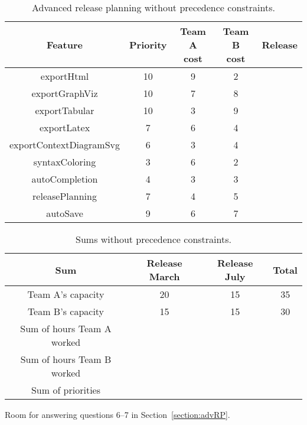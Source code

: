 \documentclass[11pt]{article}
\begin{document}
\clearpage\newpage
\begin{table}[ht]
\caption{Advanced release planning without precedence constraints.}
\centering
\begin{tabular}{|c |  c | c | c| p{15mm} |}
\hline
Feature &  Priority & \parbox[t]{14mm}{Team A \\ cost\\}  & \parbox[t]{14mm}{Team B \\ cost} & Release \\
\hline
\hline exportHtml &  10 & 9 & 2 & \\
\hline exportGraphViz   & 10 & 7 & 8 & \\ 
\hline exportTabular & 10 & 3 & 9 &\\
\hline exportLatex & 7 & 6 & 4 &\\
\hline exportContextDiagramSvg  & 6 & 3 & 4 &\\
\hline syntaxColoring  & 3 & 6 & 2 &\\
\hline autoCompletion & 4 & 3 & 3 &\\
\hline releasePlanning    & 7 & 4 & 5 &\\
\hline autoSave  & 9 & 6 & 7 &\\ 
\hline
\end{tabular}
\label{advPlan}
\end{table}

\begin{table}[ht]
\caption{Sums without precedence constraints.}
\centering
\begin{tabular}{| c | c | c | c |}
\hline
Sum & Release March & Release July & \parbox[t]{14mm}{Total \\} \\ 
\hline
\hline Team A's capacity & 20 & 15 & 35\\ 
\hline Team B's capacity & 15 & 15 & 30 \\
\hline Sum of hours Team A worked & & & \\
\hline Sum of hours Team B worked & & & \\
\hline Sum of priorities & & & \\
\hline
\end{tabular}
\label{advSum}
\end{table}

\begin{framed}
\noindent Room for answering questions 6--7 in Section~\ref{section:advRP}.
\vspace{5.5cm}
\end{framed}
\end{document}
